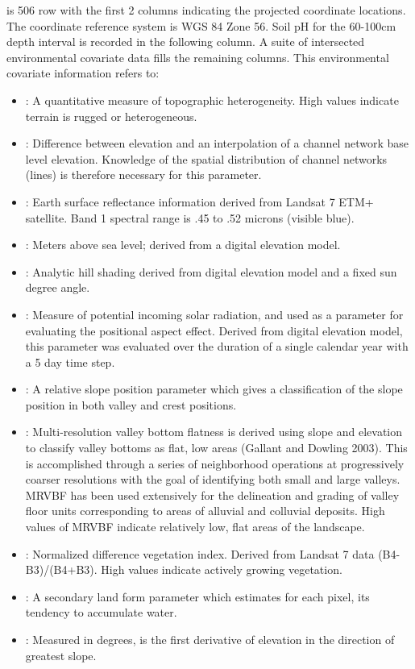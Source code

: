 \documentclass[a4paper]{book}
\begin{document}
\begin{Format}
 is 506 row  with the first 2 columns indicating the projected coordinate locations. The coordinate reference system is WGS 84 Zone 56. Soil pH for the 60-100cm depth interval is recorded in the following column. A suite of intersected environmental covariate data fills the remaining columns. This environmental covariate information refers to: 
\begin{itemize}

\item{} : A quantitative measure of topographic heterogeneity. High values indicate terrain is rugged or heterogeneous.  
\item{} : Difference between elevation and an interpolation of a channel network base level elevation. Knowledge of the spatial distribution of channel networks (lines) is therefore necessary for this parameter.
\item{} : Earth surface reflectance information derived from Landsat 7 ETM+ satellite. Band 1 spectral range is .45 to .52 microns (visible blue).
\item{} : Meters above sea level; derived from a digital elevation model.
\item{} : Analytic hill shading derived from digital elevation model and a fixed sun degree angle.
\item{} : Measure of potential incoming solar radiation, and used as a parameter for evaluating the positional aspect effect. Derived from digital elevation model, this parameter was evaluated over the duration of a single calendar year with a 5 day time step.
\item{} : A relative slope position parameter which gives a classification of the slope position in both valley and crest positions.
\item{} : Multi-resolution valley bottom flatness is derived using slope and elevation to classify valley bottoms as flat, low areas (Gallant and Dowling 2003). This is accomplished through a series of neighborhood operations at progressively coarser resolutions with the goal of identifying both small and large valleys. MRVBF has been used extensively for the delineation and grading of valley floor units corresponding to areas of alluvial and colluvial deposits. High values of MRVBF indicate relatively low, flat areas of the landscape.
\item{} : Normalized difference vegetation index. Derived from Landsat 7 data (B4-B3)/(B4+B3). High values indicate actively growing vegetation.
\item{} : A secondary land form parameter which estimates for each pixel, its tendency to accumulate water.
\item{} : Measured in degrees, is the first derivative of elevation in the direction of greatest slope.
\end{itemize}
\end{Format}
\end{document}
